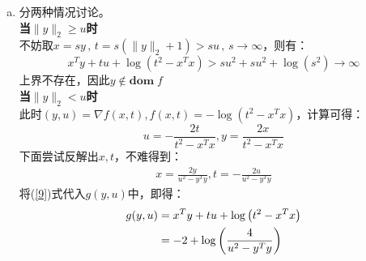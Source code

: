 \documentclass[10pt, a4paper]{article}
\begin{document}
\begin{enumerate}[(a)]
    \item 分两种情况讨论。\\
    \textbf{当$\|y\|_{2} \geq u$时}\\
    不妨取$x=s y\,,\, t=s\left(\|y\|_{2}+1\right)>s u\,,\,s \to \infty$，则有：
    \[x^{T} y+t u+\log \left(t^{2}-x^{T} x\right)>s u^{2}+s u^{2}+\log \left(s^{2}\right) \rightarrow \infty\]
    上界不存在，因此$y\notin \textbf{dom}\; f$\\
    \textbf{当$\|y\|_{2} < u$时}\\
    此时$(y, u)=\nabla f(x, t), f(x, t)=-\log \left(t^{2}-x^{T} x\right)$，计算可得：
    \[u=-\frac{2 t}{t^{2}-x^{T} x}, y=\frac{2 x}{t^{2}-x^{T} x}\]
    下面尝试反解出$x,t$，不难得到：
    \begin{align}
        x = \frac{2 y}{u^{2}-y^{T} y}, t = -\frac{2 u}{u^{2}-y^{T} y} \label{9}
    \end{align}
    将(\ref*{9})式代入$g(y,u)$中，即得：
    \begin{align}
        g(y, u) & = x^{T} y+t u+\log \left(t^{2}-x^{T} x\right) \notag \\
        & = -2+\log \left(\frac{4}{u^{2}-y^{T} y}\right) \notag
    \end{align}

\end{enumerate}

\begin{center}
    \fbox
    {}
\end{center}
\end{document}
